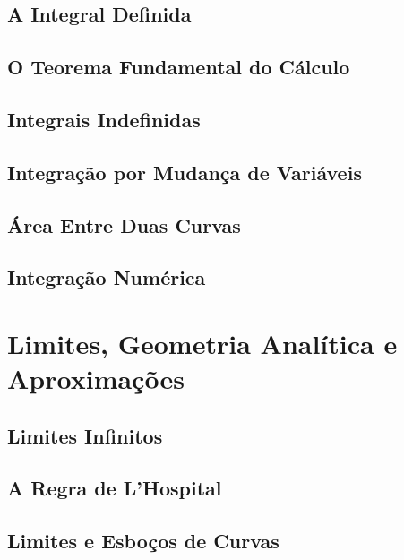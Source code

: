 \documentclass{svmono}
\begin{document}
\section{A Integral Definida}
\label{sec:definiteint}

\section{O Teorema Fundamental do Cálculo}
\label{sec:fundamentaltheo}

\section{Integrais Indefinidas}
\label{sec:indefiniteint}

\section{Integração por Mudança de Variáveis}
\label{sec:changevar}

\section{Área Entre Duas Curvas}
\label{sec:areacurves}

\section{Integração Numérica}
\label{sec:numericalint}

\chapterproblems

\chapter{Limites, Geometria Analítica e Aproximações}
\label{chp:limits}

\section{Limites Infinitos}
\label{sec:inflimits}

\section{A Regra de L'Hospital}
\label{sec:lhospital}

\section{Limites e Esboços de Curvas}
\label{sec:limsketch}
\end{document}
